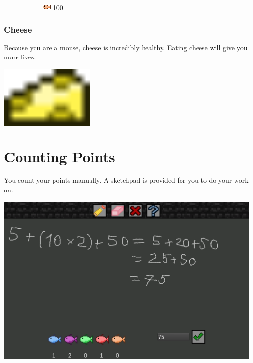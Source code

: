 \documentclass[12pt]{book}
\begin{document}
\begin{figure}[h]
					\hspace{1mm}
					\begin{subfigure}[t]{0.16\textwidth}
						\centering
						\includegraphics[width=\textwidth]{OrangeFish}
						100
					\end{subfigure}
				\end{figure}
			\subsection{Cheese}
				Because you are a mouse, cheese is incredibly healthy. Eating cheese will give you more lives.
				\begin{center}
					\includegraphics[width=0.35\textwidth]{Cheese}
				\end{center}
	\chapter{Counting Points}
		You count your points manually. A sketchpad is provided for you to do your work on.
		
		\includegraphics[width=\textwidth]{Counting}
\end{document}
